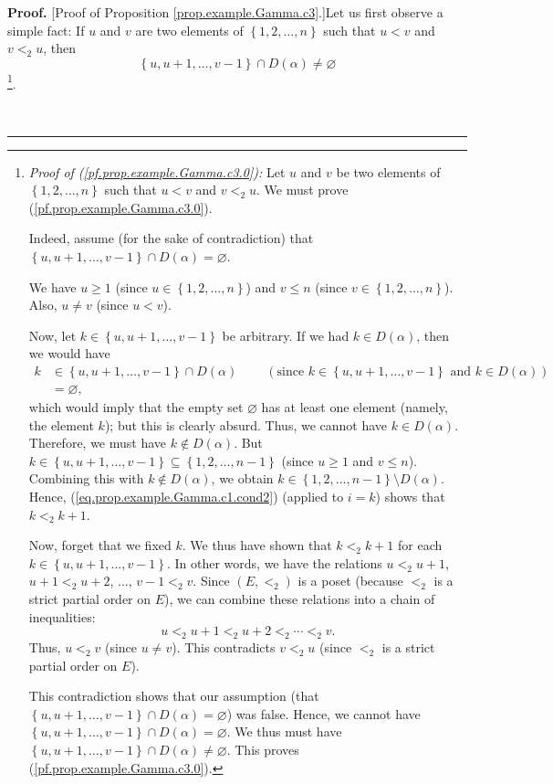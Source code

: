 \documentclass[numbers=enddot,12pt,final,onecolumn,notitlepage,abstracton]{scrartcl}
\theoremstyle{definition}
\newenvironment{proof}[1][Proof]{\noindent\textbf{#1.} }{\ \rule{0.5em}{0.5em}}
\newenvironment{verlong}{}{}
\begin{document}
\begin{verlong}
\begin{footnotesize}
\begin{proof}
[Proof of Proposition \ref{prop.example.Gamma.c3}.]Let us first observe a
simple fact: If $u$ and $v$ are two elements of $\left\{  1,2,\ldots
,n\right\}  $ such that $u<v$ and $v<_{2}u$, then
\begin{equation}
\left\{  u,u+1,\ldots,v-1\right\}  \cap D\left(  \alpha\right)  \neq
\varnothing\label{pf.prop.example.Gamma.c3.0}%
\end{equation}
\footnote{\textit{Proof of (\ref{pf.prop.example.Gamma.c3.0}):} Let $u$ and
$v$ be two elements of $\left\{  1,2,\ldots,n\right\}  $ such that $u<v$ and
$v<_{2}u$. We must prove (\ref{pf.prop.example.Gamma.c3.0}).
\par
Indeed, assume (for the sake of contradiction) that $\left\{  u,u+1,\ldots
,v-1\right\}  \cap D\left(  \alpha\right)  =\varnothing$.
\par
We have $u\geq1$ (since $u\in\left\{  1,2,\ldots,n\right\}  $) and $v\leq n$
(since $v\in\left\{  1,2,\ldots,n\right\}  $). Also, $u\neq v$ (since $u<v$).
\par
Now, let $k\in\left\{  u,u+1,\ldots,v-1\right\}  $ be arbitrary. If we had
$k\in D\left(  \alpha\right)  $, then we would have%
\begin{align*}
k  &  \in\left\{  u,u+1,\ldots,v-1\right\}  \cap D\left(  \alpha\right)
\ \ \ \ \ \ \ \ \ \ \left(  \text{since }k\in\left\{  u,u+1,\ldots
,v-1\right\}  \text{ and }k\in D\left(  \alpha\right)  \right) \\
&  =\varnothing,
\end{align*}
which would imply that the empty set $\varnothing$ has at least one element
(namely, the element $k$); but this is clearly absurd. Thus, we cannot have
$k\in D\left(  \alpha\right)  $. Therefore, we must have $k\notin D\left(
\alpha\right)  $. But $k\in\left\{  u,u+1,\ldots,v-1\right\}  \subseteq
\left\{  1,2,\ldots,n-1\right\}  $ (since $u\geq1$ and $v\leq n$). Combining
this with $k\notin D\left(  \alpha\right)  $, we obtain $k\in\left\{
1,2,\ldots,n-1\right\}  \setminus D\left(  \alpha\right)  $. Hence,
(\ref{eq.prop.example.Gamma.c1.cond2}) (applied to $i=k$) shows that
$k<_{2}k+1$.
\par
Now, forget that we fixed $k$. We thus have shown that $k<_{2}k+1$ for each
$k\in\left\{  u,u+1,\ldots,v-1\right\}  $. In other words, we have the
relations $u<_{2}u+1$, $u+1<_{2}u+2$, $\ldots$, $v-1<_{2}v$. Since $\left(
E,<_{2}\right)  $ is a poset (because $<_{2}$ is a strict partial order on
$E$), we can combine these relations into a chain of inequalities:%
\[
u<_{2}u+1<_{2}u+2<_{2}\cdots<_{2}v.
\]
Thus, $u<_{2}v$ (since $u\neq v$). This contradicts $v<_{2}u$ (since $<_{2}$
is a strict partial order on $E$).
\par
This contradiction shows that our assumption (that $\left\{  u,u+1,\ldots
,v-1\right\}  \cap D\left(  \alpha\right)  =\varnothing$) was false. Hence, we
cannot have $\left\{  u,u+1,\ldots,v-1\right\}  \cap D\left(  \alpha\right)
=\varnothing$. We thus must have $\left\{  u,u+1,\ldots,v-1\right\}  \cap
D\left(  \alpha\right)  \neq\varnothing$. This proves
(\ref{pf.prop.example.Gamma.c3.0}).}.


\end{proof}
\end{footnotesize}
\end{verlong}
\end{document}
